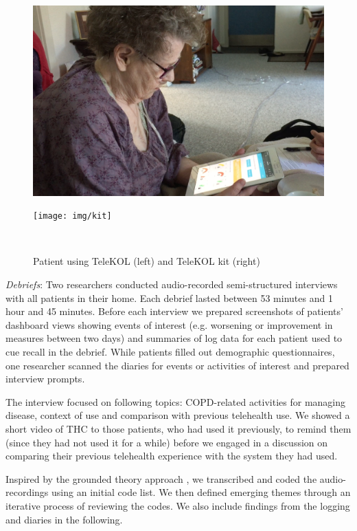  \begin{figure}[!htb]
 \centering
 \begin{minipage}[b]{0.23\textwidth}
   \includegraphics[width=\textwidth]{img/AL}
 \end{minipage}
 \hfill
 \begin{minipage}[b]{0.23\textwidth}
   \texttt{[image: img/kit]}
 \end{minipage}
  \caption{Patient using TeleKOL (left) and TeleKOL kit (right)}~\label{fig:kit}
\end{figure}


\textit{Debriefs}: Two researchers conducted audio-recorded semi-structured interviews with all patients in their home. Each debrief lasted between 53 minutes and 1 hour and 45 minutes. Before each interview we prepared screenshots of patients' dashboard views showing events of interest (e.g. worsening or improvement in measures between two days) and summaries of log data for each patient used to cue recall in the debrief. While patients filled out demographic questionnaires, one researcher scanned the diaries for events or activities of interest and prepared interview prompts. 

The interview focused on following topics: COPD-related activities for managing disease, context of use and comparison with previous telehealth use. We showed a short video of THC to those patients, who had used it previously, to remind them (since they had not used it for a while) before we engaged in a discussion on comparing their previous telehealth experience with the system they had used. 

Inspired by the grounded theory approach \cite{IDbook}, we transcribed and coded the audio-recordings using an initial code list. We then defined emerging themes through an iterative process of reviewing the codes. We also include findings from the logging and diaries in the following. 

